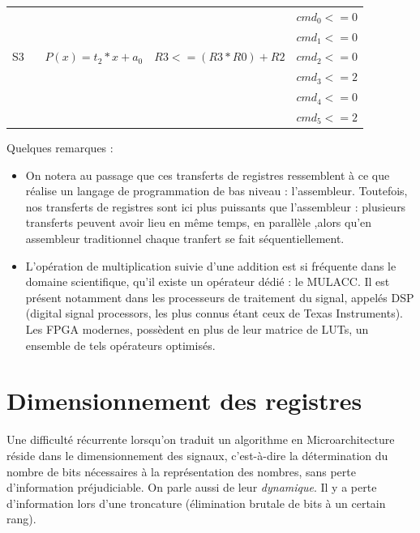 \documentclass[a4paper,11pt]{exam}
\begin{document}
\begin{questions}
\begin{solution}
\begin{tabular}{|c | c | c | c|}
      \hline
      ~   & ~                   & ~                         & $cmd_0 <= 0$                  \\
      ~   & ~                   & ~                         & $cmd_1 <= 0$                  \\
      S3  & ~ $P(x)=t_2*x+a_0$  & $R3 <= (R3*R0)+R2$        & $cmd_2 <= 0$                  \\
      ~   & ~                   & ~                         & $cmd_3 <= 2$                  \\
      ~   & ~                   & ~                         & $cmd_4 <= 0$                  \\
      ~   & ~                   & ~                         & $cmd_5 <= 2$                  \\
      \hline
    \end{tabular}
    \newline

    Quelques remarques :
    \begin{itemize}
      \item On notera au passage que ces transferts de registres ressemblent à ce que réalise un langage de programmation de bas niveau : l'assembleur. Toutefois, nos transferts de registres sont ici plus puissants que l'assembleur : plusieurs transferts peuvent avoir lieu en même temps, en parallèle ,alors qu'en assembleur traditionnel chaque tranfert se fait séquentiellement.
      \item L'opération de multiplication suivie d'une addition est si fréquente dans le domaine scientifique, qu'il existe un opérateur dédié : le MULACC. Il est présent notamment dans les processeurs de traitement du signal, appelés DSP (digital signal processors, les plus connus étant ceux de Texas Instruments). Les FPGA modernes, possèdent en plus de leur matrice de LUTs, un ensemble de tels opérateurs optimisés.
    \end{itemize}
  \end{solution}
\end{questions}

\section{Dimensionnement des registres}

Une difficulté récurrente lorsqu'on traduit un algorithme en Microarchitecture réside dans le dimensionnement des signaux, c'est-à-dire la détermination du nombre de bits nécessaires à la représentation des nombres, sans perte d'information préjudiciable. On parle aussi de leur \textit{dynamique}. Il y a perte d'information lors d'une troncature (élimination brutale de bits à un certain rang).
\end{document}
